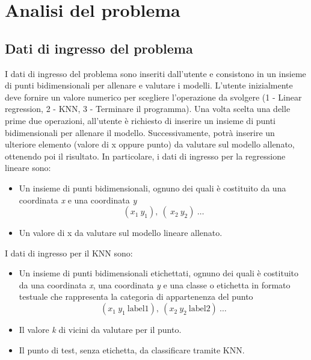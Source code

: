 \documentclass[11pt]{article}
\theoremstyle{definition}
\begin{document}
\newpage

\section{Analisi del problema}

\subsection{Dati di ingresso del problema}
I dati di ingresso del problema sono inseriti dall'utente e consistono in un insieme di punti bidimensionali per allenare e valutare i modelli. L'utente inizialmente deve fornire un valore numerico per scegliere l'operazione da svolgere (1 - Linear regression, 2 - KNN, 3 - Terminare il programma). Una volta scelta una delle prime due operazioni, all'utente è richiesto di inserire un insieme di punti bidimensionali per allenare il modello. Successivamente, potrà inserire un ulteriore elemento (valore di x oppure punto) da valutare sul modello allenato, ottenendo poi il risultato. In particolare, i dati di ingresso per la regressione lineare sono:
\begin{itemize}
\item Un insieme di punti bidimensionali, ognuno dei quali è costituito da una coordinata \textit{x} e una coordinata \textit{y} 
$$(x_1 \ y_1),\  (\ x_2 \ y_2) \ \dots $$
\item Un valore di x da valutare sul modello lineare allenato.
\end{itemize}
I dati di ingresso per il KNN sono:
\begin{itemize}
\item Un insieme di punti bidimensionali etichettati, ognuno dei quali è costituito da una coordinata \textit{x}, una coordinata \textit{y} e una classe o etichetta in formato testuale che rappresenta la categoria di appartenenza del punto
$$
(x_1 \ y_1 \ \text{label1}),\  (x_2 \ y_2 \ \text{label2}) \ \dots 
$$
\item Il valore \textit{k} di vicini da valutare per il punto.
\item Il punto di test, senza etichetta, da classificare tramite KNN.
\end{itemize}
\end{document}
